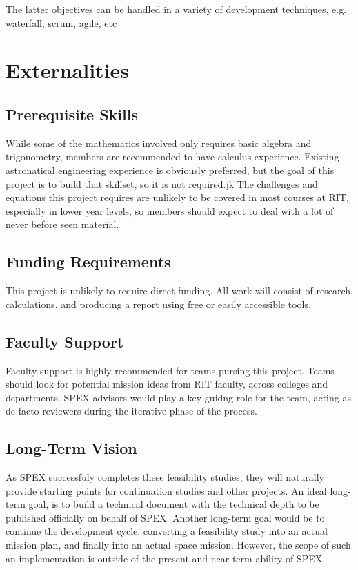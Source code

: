 \documentclass[conference]{IEEEtran} %
\begin{document}
The latter objectives can be handled in a variety of development techniques, e.g. waterfall, scrum, agile, etc
\section{Externalities}
\subsection{Prerequisite Skills}
While some of the mathematics involved only requires basic algebra and trigonometry, members are recommended to have calculus experience.
Existing astronatical engineering experience is obviously preferred, but the goal of this project is to build that skillset, so it is not required.jk
The challenges and equations this project requires are unlikely to be covered in most courses at RIT, especially in lower year levels, so members should expect to deal with a lot of never before seen material.

\subsection{Funding Requirements}
This project is unlikely to require direct funding. All work will consist of research, calculations, and producing a report using free or easily accessible tools.

\subsection{Faculty Support}
Faculty support is highly recommended for teams pursing this project.
Teams should look for potential mission ideas from RIT faculty, across colleges and departments.
SPEX advisors would play a key guidng role for the team, acting as de facto reviewers during the iterative phase of the process.
\subsection{Long-Term Vision}
\label{sec:vision}
As SPEX successfuly completes these feasibility studies, they will naturally provide starting points for continuation studies and other projects.
An ideal long-term goal, is to build a technical document with the technical depth to be published officially on behalf of SPEX.
Another long-term goal would be to continue the development cycle, converting a feasibility study into an actual mission plan, and finally into an actual space mission.
However, the scope of such an implementation is outside of the present and near-term ability of SPEX.
\end{document}

